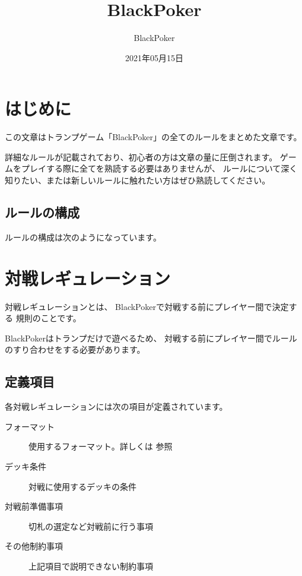\documentclass[letterpaper,10pt,dvipdfmx]{sphinxmanual}
\title{BlackPoker}
\date{2021年05月15日}
\author{BlackPoker}
\begin{document}
\pagestyle{empty}
\sphinxmaketitle
\pagestyle{plain}
\sphinxtableofcontents
\pagestyle{normal}
\label{\detokenize{index::doc}}



\chapter{はじめに}
\label{\detokenize{init/init:id1}}\label{\detokenize{init/init::doc}}
この文章はトランプゲーム「BlackPoker」の全てのルールをまとめた文章です。

詳細なルールが記載されており、初心者の方は文章の量に圧倒されます。
ゲームをプレイする際に全てを熟読する必要はありませんが、
ルールについて深く知りたい、または新しいルールに触れたい方はぜひ熟読してください。


\section{ルールの構成}
\label{\detokenize{init/init:id2}}
ルールの構成は次のようになっています。

\noindent{}


\chapter{対戦レギュレーション}
\label{\detokenize{match-regulations/match-regulations:id1}}\label{\detokenize{match-regulations/match-regulations::doc}}
対戦レギュレーションとは、
BlackPokerで対戦する前にプレイヤー間で決定する
規則のことです。

BlackPokerはトランプだけで遊べるため、
対戦する前にプレイヤー間でルールのすり合わせをする必要があります。


\section{定義項目}
\label{\detokenize{match-regulations/match-regulations:id2}}
各対戦レギュレーションには次の項目が定義されています。
\begin{description}
\item[{フォーマット}] \leavevmode
使用するフォーマット。詳しくは {\hyperref[\detokenize{format/format::doc}]{}} 参照

\item[{デッキ条件}] \leavevmode
対戦に使用するデッキの条件

\item[{対戦前準備事項}] \leavevmode
切札の選定など対戦前に行う事項

\item[{その他制約事項}] \leavevmode
上記項目で説明できない制約事項

\end{description}
\end{document}
